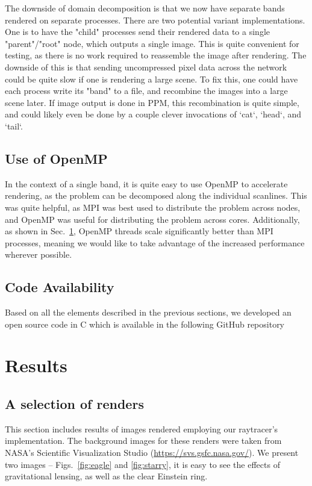 The downside of domain decomposition is that we now have separate bands rendered on separate processes. There are two potential variant implementations. One is to have the "child" processes send their rendered data to a single "parent"/"root" node, which outputs a single image. This is quite convenient for testing, as there is no work required to reassemble the image after rendering. The downside of this is that sending uncompressed pixel data across the network could be quite slow if one is rendering a large scene. To fix this, one could have each process write its "band" to a file, and recombine the images into a large scene later. If image output is done in PPM, this recombination is quite simple, and could likely even be done by a couple clever invocations of `cat`, `head`, and `tail`.


\subsection{Use of OpenMP}
In the context of a single band, it is quite easy to use OpenMP \cite{660313_OMP} to accelerate rendering, as the problem can be decomposed along the individual scanlines. This was quite helpful, as MPI was best used to distribute the problem across nodes, and OpenMP was useful for distributing the problem across cores.
Additionally, as shown in Sec.~\ref{sec:results}, OpenMP threads scale significantly better than MPI processes, meaning we would like to take advantage of the increased performance wherever possible.


\subsection{Code Availability}
Based on all the elements described in the previous sections,
we developed an open source code in C which is available in the following
GitHub repository




\section{Results}
\label{sec:results}

\subsection{A selection of renders}

This section includes results of images rendered employing our raytracer's implementation.
The background images for these renders were taken from NASA's Scientific Visualization Studio (\url{https://svs.gsfc.nasa.gov/}).
We present two images -- Figs.~\ref{fig:eagle} and \ref{fig:starry}, it is easy to see the effects of gravitational lensing, as well as the clear Einstein ring. 


